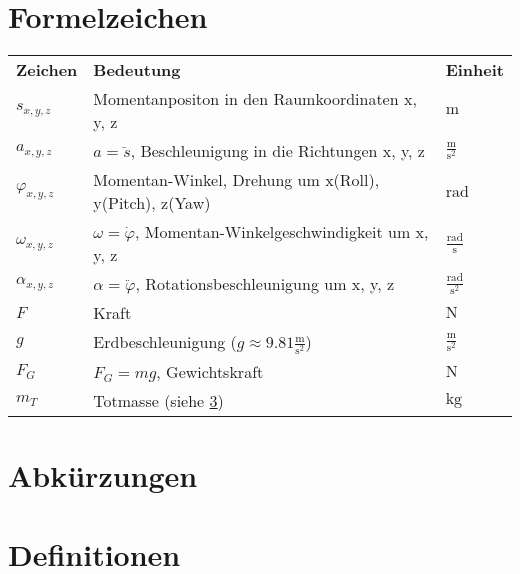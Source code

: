 
\section{Formelzeichen}

\renewcommand{\arraystretch}{1.5}
\begin{table}[!h]
\label{tab:formelzeichen}
\begin{tabular}{l p{9cm} l}
\textbf{Zeichen} & \textbf{Bedeutung} & \textbf{Einheit}  \\ 
  $s_{x, y, z}$ & Momentanpositon in den Raumkoordinaten x, y, z & $	\mathrm{m}$ \\ 
  $a_{x, y, z}$ & $a = \ddot{s}$, Beschleunigung in die Richtungen x, y, z & $ 	\mathrm{\frac{m}{s^2}}$ \\ 
  $\varphi_{x, y, z}$ & Momentan-Winkel, \newline Drehung um x(Roll), y(Pitch), z(Yaw) & $	\mathrm{rad}$ \\ 
  $\omega_{x, y, z}$ & $\omega =  \dot{\varphi}$, Momentan-Winkelgeschwindigkeit um x, y, z & $	\mathrm{\frac{rad}{s}}$ \\ 
  $\alpha_{x, y, z}$ & $\alpha = \ddot{\varphi}$, Rotationsbeschleunigung um x, y, z & $	\mathrm{\frac{rad}{s^2}}$ \\ 
  $F$ & Kraft & $	\mathrm{N}$ \\ 
  $g$ & Erdbeschleunigung ($g \approx 9.81 \mathrm{\frac{m}{s^2}}$) & $	\mathrm{\frac{m}{s^2}}$ \\ 
  $F_G$ & $F_G = m g$, Gewichtskraft & $	\mathrm{N}$ \\ 
  $m_T$ & Totmasse (siehe \ref{sec:definitionen})& $	\mathrm{kg}$ \\
\end{tabular}
\end{table}
\renewcommand{\arraystretch}{1}

\section{Abkürzungen}
\begin{acronym}[FACT] %
\end{acronym}

\vfill %

\section{Definitionen}
\label{sec:definitionen}

